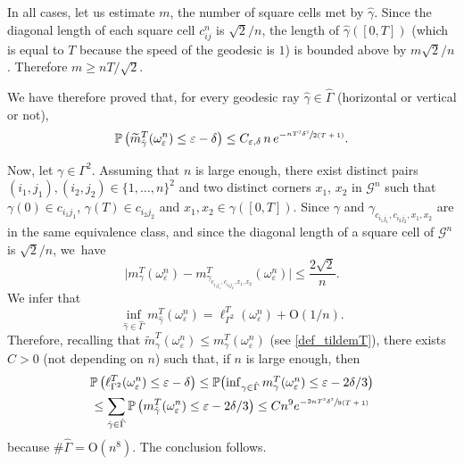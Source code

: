 \documentclass[10pt]{amsart}
\theoremstyle{definition}
\begin{document}
{In all cases, let us estimate $m$, the number of square cells met by $\hat \gamma$.
Since the diagonal length of each square cell $c_{ij}^n$ is $\sqrt{2}/n$, the length of $\hat\gamma([0,T])$ (which is equal to $T$ because the speed of the geodesic is $1$) is bounded above by $m\sqrt{2}/n$. Therefore $m\geq nT/\sqrt{2}$.

We have therefore proved that, for every geodesic ray $\hat \gamma\in\hat\Gamma$ (horizontal or vertical or not),
\begin{equation}\label{semicont21800}
\mathbb{P}\left( \widetilde m_{\hat \gamma}^T(\omega_\varepsilon^n) \leq \varepsilon-\delta \right) \leq C_{\varepsilon, \delta} \, {n} \, {e^{-\sfrac{nT^2 \delta^2}{2(T+1)}} }.
\end{equation}
}

Now, let $\gamma\in \Gamma^2$. {Assuming that $n$ is large enough,} there exist {distinct pairs} $(i_1,j_1),(i_2,j_2)\in \{1,\ldots,n\}^2$ and two {distinct} corners $x_1$, $x_2$ in $\mathcal{G}^n$ such that $\gamma(0)\in c_{i_1j_1}$, $\gamma(T)\in c_{i_2j_2}$ and $x_1,x_2\in \gamma([0,T])$.
{Since $\gamma$ and $\gamma_{c_{i_1j_1},c_{i_2j_2},x_1,x_2}$ are in the same equivalence class, and} since the diagonal length of a square cell of $\mathcal{G}^n$ is $\sqrt{2}/n$, we~have
\[
\bigl| m^T_{\gamma}(\omega_\varepsilon^n)- m^T_{\gamma_{c_{i_1j_1},c_{i_2j_2},x_1,x_2}}(\omega_\varepsilon^n) \bigr|\leq \frac{2\sqrt{2}}{n}.
\]
We infer that
\[
\inf_{\hat\gamma\in \hat \Gamma} m^T_{\hat\gamma}(\omega_\varepsilon^n)=\ell_{\Gamma^2}^T(\omega_\varepsilon^n)+\mathrm{O}(1/n).
\]
Therefore, recalling that $\widetilde m^T_\gamma(\omega_\varepsilon^n) \leq m^T_\gamma(\omega_\varepsilon^n)$ (see \eqref{def_tildemT}),
there exists $C>0$ (not depen\-ding on $n$) such that, if $n$ is large enough, then
\begin{multline*}
\mathbb{P}\left( \ell_{\Gamma^2}^T(\omega_\varepsilon^n)\leq \varepsilon-\delta\right) \leq \mathbb{P}\bigl({\textstyle\inf_{\gamma\in \hat \Gamma} m^T_\gamma(\omega_\varepsilon^n)\leq \varepsilon -2\delta/3}\bigr) \\
\leq \sum_{\hat\gamma\in \hat \Gamma}\mathbb{P}\left(m^T_{\hat\gamma}(\omega_\varepsilon^n)\leq \varepsilon -2\delta/3\right)\leq C n^9 {e^{-\sfrac{2nT^2 \delta^2}{9(T+1)}} }
\end{multline*}
because $\#\hat \Gamma=\mathrm{O} (n^8)$. The conclusion follows.

\label{sec:LD}
\end{document}
